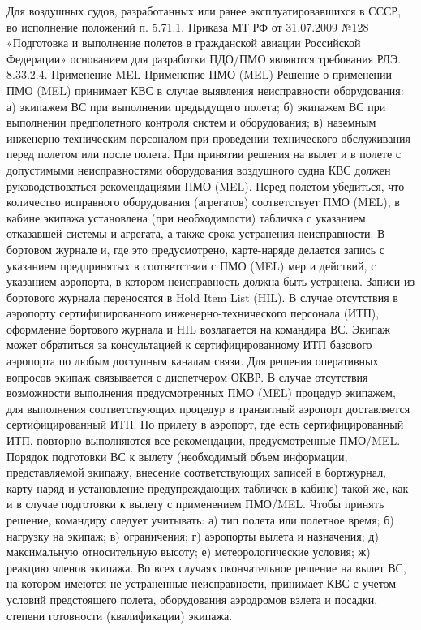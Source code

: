 Для воздушных судов, разработанных или ранее эксплуатировавшихся в СССР, во исполнение положений п. 5.71.1. Приказа МТ РФ от 31.07.2009 №128 «Подготовка и выполнение полетов в гражданской авиации Российской Федерации» основанием для разработки ПДО/ПМО являются требования РЛЭ. 
8.33.2.4.	Применение MEL
Применение ПМО (MEL)
Решение о применении ПМО (MEL) принимает КВС в случае выявления неисправности оборудования:
а)	экипажем ВС при выполнении предыдущего полета;
б)	экипажем ВС при выполнении предполетного контроля систем и оборудования;
в)	наземным инженерно-техническим персоналом при проведении технического обслуживания перед полетом или после полета.
При принятии решения на вылет и в полете с допустимыми неисправностями оборудования воздушного судна КВС должен руководствоваться рекомендациями ПМО (MEL). Перед полетом убедиться, что количество исправного оборудования (агрегатов) соответствует ПМО (MEL), в кабине экипажа установлена (при необходимости) табличка с указанием отказавшей системы и агрегата, а также срока устранения неисправности. В бортовом журнале и, где это предусмотрено, карте-наряде делается запись с указанием предпринятых в соответствии с ПМО (MEL) мер и действий, с указанием аэропорта, в котором неисправность должна быть устранена. 
Записи из бортового журнала переносятся в Hold Item List (HIL). 
В случае отсутствия в аэропорту сертифицированного инженерно-технического персонала (ИТП), оформление бортового журнала и HIL возлагается на командира ВС. Экипаж может обратиться за консультацией к сертифицированному ИТП базового аэропорта по любым доступным каналам связи. Для решения оперативных вопросов экипаж связывается с диспетчером ОКВР.
В случае отсутствия возможности выполнения предусмотренных ПМО (MEL) процедур экипажем, для выполнения соответствующих процедур в транзитный аэропорт доставляется сертифицированный ИТП.
По прилету в аэропорт, где есть сертифицированный ИТП, повторно выполняются все рекомендации, предусмотренные ПМО/MEL. 
Порядок подготовки ВС к вылету (необходимый объем информации, представляемой экипажу, внесение соответствующих записей в бортжурнал, карту-наряд и установление предупреждающих табличек в кабине) такой же, как и в случае подготовки к вылету с применением ПМО/MEL.
Чтобы принять решение, командиру следует учитывать:
а)	тип полета или полетное время;
б)	нагрузку на экипаж;
в)	ограничения;
г)	аэропорты вылета и назначения;
д)	максимальную относительную высоту; 
е)	метеорологические условия;
ж)	реакцию членов экипажа.
Во всех случаях окончательное решение на вылет ВС, на котором имеются не устраненные неисправности, принимает КВС с учетом условий предстоящего полета, оборудования аэродромов взлета и посадки, степени готовности (квалификации) экипажа.
